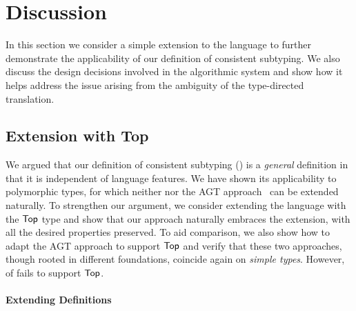 
\section{Discussion}
\label{sec:discussion}

In this section we consider a simple extension to the language to further
demonstrate the applicability of our definition of consistent subtyping. We also
discuss the design decisions involved in the algorithmic system and show how it
helps address the issue arising from the ambiguity of the type-directed
translation.

\subsection{Extension with Top}
\label{subsec:extension-top}

We argued that our definition of consistent subtyping ()
is a \textit{general} definition in that it is independent of language features.
We have shown its applicability to polymorphic types, for which neither
\citet{siek2007gradual} nor the AGT approach~\citep{garcia2016abstracting} can
be extended naturally. To strengthen our argument, we consider extending the
language with the $\mathsf{Top}$ type and show that our approach naturally embraces the
extension, with all the desired properties preserved. To aid comparison, we also
show how to adapt the AGT approach to support $\mathsf{Top}$ and verify that these two
approaches, though rooted in different foundations, coincide again on
\textit{simple types}. However,  of
\citet{siek2007gradual} fails to support $\mathsf{Top}$.


\paragraph{Extending Definitions}

